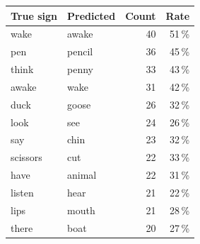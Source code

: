 \begin{tabular}{llrr}
\toprule
True sign & Predicted & Count & Rate \\
\midrule
wake & awake & 40 & 51\,\% \\
pen & pencil & 36 & 45\,\% \\
think & penny & 33 & 43\,\% \\
awake & wake & 31 & 42\,\% \\
duck & goose & 26 & 32\,\% \\
look & see & 24 & 26\,\% \\
say & chin & 23 & 32\,\% \\
scissors & cut & 22 & 33\,\% \\
have & animal & 22 & 31\,\% \\
listen & hear & 21 & 22\,\% \\
lips & mouth & 21 & 28\,\% \\
there & boat & 20 & 27\,\% \\
\bottomrule
\end{tabular}
